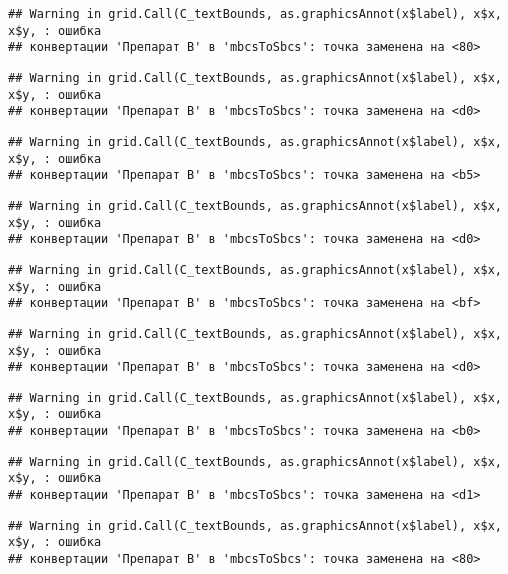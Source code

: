 \documentclass[
]{article}
\begin{document}
\begin{verbatim}
## Warning in grid.Call(C_textBounds, as.graphicsAnnot(x$label), x$x, x$y, : ошибка
## конвертации 'Препарат B' в 'mbcsToSbcs': точка заменена на <80>
\end{verbatim}

\begin{verbatim}
## Warning in grid.Call(C_textBounds, as.graphicsAnnot(x$label), x$x, x$y, : ошибка
## конвертации 'Препарат B' в 'mbcsToSbcs': точка заменена на <d0>
\end{verbatim}

\begin{verbatim}
## Warning in grid.Call(C_textBounds, as.graphicsAnnot(x$label), x$x, x$y, : ошибка
## конвертации 'Препарат B' в 'mbcsToSbcs': точка заменена на <b5>
\end{verbatim}

\begin{verbatim}
## Warning in grid.Call(C_textBounds, as.graphicsAnnot(x$label), x$x, x$y, : ошибка
## конвертации 'Препарат B' в 'mbcsToSbcs': точка заменена на <d0>
\end{verbatim}

\begin{verbatim}
## Warning in grid.Call(C_textBounds, as.graphicsAnnot(x$label), x$x, x$y, : ошибка
## конвертации 'Препарат B' в 'mbcsToSbcs': точка заменена на <bf>
\end{verbatim}

\begin{verbatim}
## Warning in grid.Call(C_textBounds, as.graphicsAnnot(x$label), x$x, x$y, : ошибка
## конвертации 'Препарат B' в 'mbcsToSbcs': точка заменена на <d0>
\end{verbatim}

\begin{verbatim}
## Warning in grid.Call(C_textBounds, as.graphicsAnnot(x$label), x$x, x$y, : ошибка
## конвертации 'Препарат B' в 'mbcsToSbcs': точка заменена на <b0>
\end{verbatim}

\begin{verbatim}
## Warning in grid.Call(C_textBounds, as.graphicsAnnot(x$label), x$x, x$y, : ошибка
## конвертации 'Препарат B' в 'mbcsToSbcs': точка заменена на <d1>
\end{verbatim}

\begin{verbatim}
## Warning in grid.Call(C_textBounds, as.graphicsAnnot(x$label), x$x, x$y, : ошибка
## конвертации 'Препарат B' в 'mbcsToSbcs': точка заменена на <80>
\end{verbatim}
\end{document}
